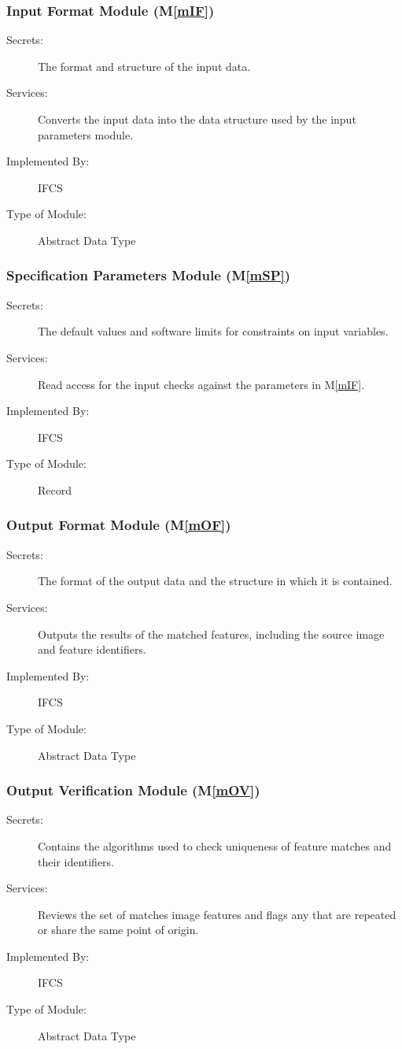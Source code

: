 \documentclass[12pt, titlepage]{article}
\newcommand{\mref}[1]{M\ref{#1}}
\begin{document}
\subsubsection{Input Format Module (\mref{mIF})}
\begin{description}
\item[Secrets:]The format and structure of the input data.
\item[Services:]Converts the input data into the data structure used by the
  input parameters module.
\item[Implemented By:] IFCS
\item[Type of Module:] Abstract Data Type
\end{description}

\subsubsection{Specification Parameters Module (\mref{mSP})}

\begin{description}
\item[Secrets:] The default values and software limits for constraints on input 
variables.
\item[Services:]Read access for the input checks against the parameters in 
\mref{mIF}.
\item[Implemented By:] IFCS
\item[Type of Module:] Record
\end{description}

\subsubsection{Output Format Module (\mref{mOF})}

\begin{description}
\item[Secrets:]The format of the output data and the structure in which it is contained.
\item[Services:]Outputs the results of the matched features, including the source image and 
feature identifiers.
\item[Implemented By:] IFCS
\item[Type of Module:] Abstract Data Type
\end{description}


\subsubsection{Output Verification Module (\mref{mOV})}
\begin{description}
\item[Secrets:]Contains the algorithms used to check uniqueness of feature matches and their 
identifiers.
\item[Services:]Reviews the set of matches image features and flags any that are repeated 
or share the same point of origin.
\item[Implemented By:] IFCS
\item[Type of Module:] Abstract Data Type
\end{description}
\end{document}

